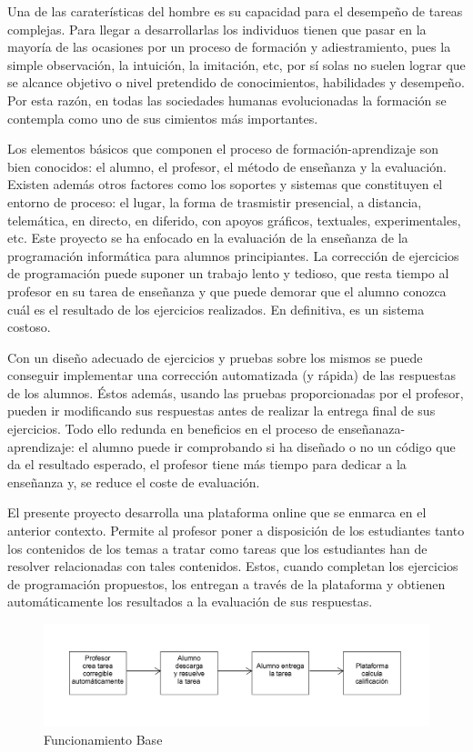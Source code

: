 
Una de las caraterísticas del hombre es su capacidad para el desempeño de tareas complejas. Para llegar a desarrollarlas los individuos tienen que pasar en la mayoría de las ocasiones por un proceso de formación y adiestramiento, pues la simple observación, la intuición, la imitación, etc, por sí solas no suelen lograr que se alcance objetivo o nivel pretendido de conocimientos, habilidades y desempeño. Por esta razón, en todas las sociedades humanas evolucionadas la formación se contempla como uno de sus cimientos más importantes.

Los elementos básicos que componen el proceso de formación-aprendizaje son bien conocidos: el alumno, el profesor, el método de enseñanza y la evaluación. Existen además otros factores como los soportes y sistemas que constituyen el entorno de proceso: el lugar, la forma de trasmistir presencial, a distancia, telemática, en directo, en diferido, con apoyos gráficos, textuales, experimentales, etc.
Este proyecto se ha enfocado en la evaluación de la enseñanza de la programación informática para alumnos principiantes. La corrección de ejercicios de programación puede suponer un trabajo lento y tedioso, que resta tiempo al profesor en su tarea de enseñanza y que puede demorar que el alumno conozca cuál es el resultado de los ejercicios realizados. En definitiva, es un sistema costoso.

Con un diseño adecuado de ejercicios y pruebas sobre los mismos se puede conseguir implementar una corrección automatizada (y rápida) de las respuestas de los alumnos. Éstos además, usando las pruebas proporcionadas por el profesor, pueden ir modificando sus respuestas antes de realizar la entrega final de sus ejercicios. Todo ello redunda en beneficios en el proceso de enseñanaza-aprendizaje: el alumno puede ir comprobando si ha diseñado o no un código que da el resultado esperado, el profesor tiene más tiempo para dedicar a la enseñanza y, se reduce el coste de evaluación.

El presente proyecto desarrolla una plataforma online que se enmarca en el anterior contexto. Permite al profesor poner a disposición de los estudiantes tanto los contenidos de los temas a tratar como tareas que los estudiantes han de resolver relacionadas con tales contenidos. Estos, cuando completan los ejercicios de programación propuestos, los entregan a través de la plataforma y obtienen automáticamente los resultados a la evaluación de sus respuestas.

\begin{figure}[h]
    \centering
    \includegraphics[width=\textwidth]{img/imgs-memoria/FuncionamientoBase.PNG}
    \caption{Funcionamiento Base}
\end{figure}